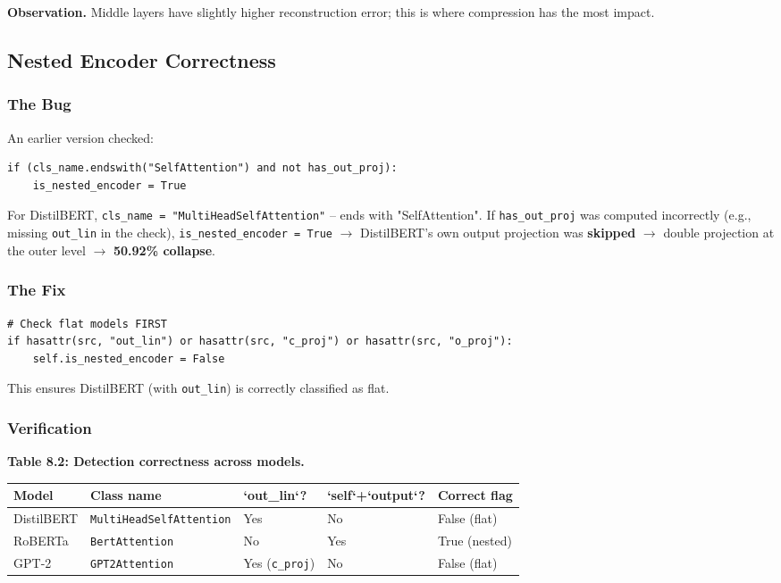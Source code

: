 \textbf{Observation.} Middle layers have slightly higher reconstruction error; 
this is where compression has the most impact.

\subsection{Nested Encoder Correctness}

\subsubsection{The Bug}

An earlier version checked:
\begin{lstlisting}
if (cls_name.endswith("SelfAttention") and not has_out_proj):
    is_nested_encoder = True
\end{lstlisting}

For DistilBERT, \texttt{cls\_name = "MultiHeadSelfAttention"} -- ends with 
"SelfAttention". If \texttt{has\_out\_proj} was computed incorrectly (e.g., missing 
\texttt{out\_lin} in the check), \texttt{is\_nested\_encoder = True} $\to$ DistilBERT's own output 
projection was \textbf{skipped} $\to$ double projection at the outer level $\to$ 
\textbf{50.92\% collapse}.

\subsubsection{The Fix}

\begin{lstlisting}
# Check flat models FIRST
if hasattr(src, "out_lin") or hasattr(src, "c_proj") or hasattr(src, "o_proj"):
    self.is_nested_encoder = False
\end{lstlisting}

This ensures DistilBERT (with \texttt{out\_lin}) is correctly classified as flat.

\subsubsection{Verification}

\textbf{Table 8.2: Detection correctness across models.}

\begin{table}[H]
\centering
\small
\begin{tabular}{lllll}
\toprule
\textbf{Model} & \textbf{Class name} & \textbf{`out\_lin`?} & \textbf{`self`+`output`?} & \textbf{Correct flag} \\
\midrule
DistilBERT & \texttt{MultiHeadSelfAttention} & Yes & No & False (flat) \\
RoBERTa & \texttt{BertAttention} & No & Yes & True (nested) \\
GPT-2 & \texttt{GPT2Attention} & Yes (\texttt{c\_proj}) & No & False (flat) \\
\bottomrule
\end{tabular}
\end{table}


